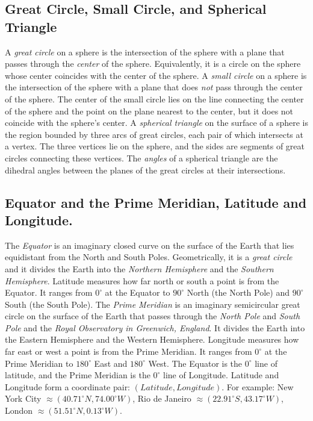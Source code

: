 \documentclass[12pt, reqno]{amsart}
\theoremstyle{plain}
\theoremstyle{definition}
\begin{document}
\subsection{Great Circle, Small Circle, and Spherical Triangle}
A \emph{great circle} on a sphere is the intersection of the sphere with a plane that passes through the \emph{center} of the sphere. 
Equivalently, it is a circle on the sphere whose center coincides with the center of the sphere. 
A \emph{small circle} on a sphere is the intersection of the sphere with a plane that does \emph{not} pass through the center of the sphere. 
The center of the small circle lies on the line connecting the center of the sphere and the point on the plane nearest to the center, 
but it does not coincide with the sphere’s center. 
  A \emph{spherical triangle} on the surface of a sphere is the region bounded by three arcs of great circles, 
each pair of which intersects at a vertex. 
The three vertices lie on the sphere, and the sides are segments of great circles connecting these vertices. 
The \emph{angles} of a spherical triangle are the dihedral angles between the planes of the great circles at their intersections.
 

 \subsection{Equator and the Prime Meridian, Latitude and Longitude.} 
The \emph{Equator} is an imaginary closed curve on the surface of the Earth that lies equidistant from the 
North and South Poles. Geometrically, it is a \emph{great circle} and it divides the Earth into the \emph{Northern Hemisphere} and the 
\emph{Southern Hemisphere}. Latitude measures how far north or south a point is from the Equator. It ranges from $0^{\circ}$ at the Equator to $90^{\circ}$ North (the North Pole) and $90^{\circ}$ South (the South Pole). 
 The \emph{Prime Meridian} is an imaginary semicircular great circle on the surface of the Earth that passes 
through the \emph{North Pole} and \emph{South Pole} and the \emph{Royal Observatory in Greenwich, England}. It divides the Earth into the Eastern Hemisphere and the Western Hemisphere. Longitude measures how far east or west a point is from the Prime Meridian. It ranges from $0^{\circ}$ at the Prime Meridian  to $180^{\circ}$ East and $180^{\circ}$ West. The Equator is the $0^{\circ}$ line of latitude, and the Prime Meridian is the $0^{\circ}$ line of Longitude. 
Latitude and Longitude form a coordinate pair: $(Latitude,Longitude)$. For example: New York City $\approx (40.71^{\circ} N, 74.00^{\circ} W)$, 
Rio de Janeiro $\approx(22.91^{\circ} S, 43.17^{\circ} W)$, London $\approx(51.51^{\circ} N, 0.13^{\circ} W)$.
\end{document}
